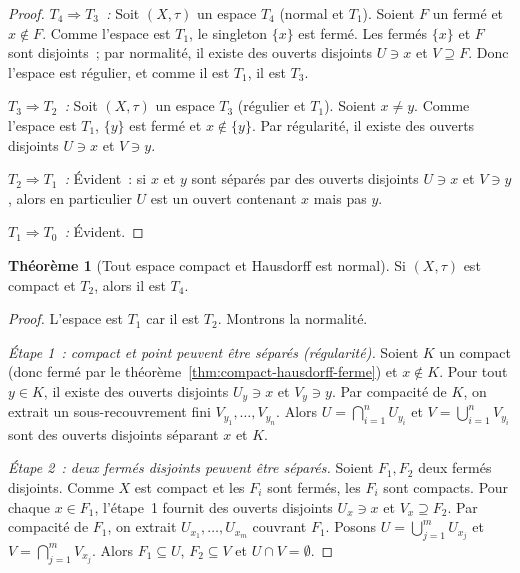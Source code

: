 \documentclass[12pt,a4paper,openany]{book}
\theoremstyle{definition}
\theoremstyle{cours}
\newtheorem{theoreme}{Théorème}[chapter]
\theoremstyle{coursnormal}
\begin{document}
\begin{proof}
  \emph{$T_4\Rightarrow T_3$~:} Soit $(X,\tau)$ un espace $T_4$ (normal et $T_1$).
  Soient $F$ un fermé et $x\notin F$. Comme l'espace est $T_1$, le singleton
  $\{x\}$ est fermé. Les fermés $\{x\}$ et $F$ sont disjoints~; par normalité,
  il existe des ouverts disjoints $U\ni x$ et $V\supseteq F$. Donc l'espace
  est régulier, et comme il est $T_1$, il est $T_3$.

  \medskip
  \emph{$T_3\Rightarrow T_2$~:} Soit $(X,\tau)$ un espace $T_3$ (régulier et $T_1$).
  Soient $x\neq y$. Comme l'espace est $T_1$, $\{y\}$ est fermé et $x\notin\{y\}$.
  Par régularité, il existe des ouverts disjoints $U\ni x$ et $V\ni y$.

  \medskip
  \emph{$T_2\Rightarrow T_1$~:} Évident~: si $x$ et $y$ sont séparés par
  des ouverts disjoints $U\ni x$ et $V\ni y$, alors en particulier $U$ est un
  ouvert contenant $x$ mais pas $y$.

  \medskip
  \emph{$T_1\Rightarrow T_0$~:} Évident.
\end{proof}

\begin{theoreme}[Tout espace compact et Hausdorff est normal]\label{thm:compact-hausdorff-normal}
  Si $(X,\tau)$ est compact et $T_2$,
  alors il est $T_4$.
\end{theoreme}

\begin{proof}
  L'espace est $T_1$ car il est $T_2$. Montrons la normalité.

  \medskip
  \emph{Étape 1~: compact et point peuvent être séparés (régularité).}
  Soient $K$ un compact (donc fermé par le théorème~\ref{thm:compact-hausdorff-ferme})
  et $x\notin K$. Pour tout $y\in K$, il existe des ouverts disjoints $U_y\ni x$
  et $V_y\ni y$. Par compacité de $K$, on extrait un sous-recouvrement fini
  $V_{y_1},\ldots,V_{y_n}$. Alors $U=\bigcap_{i=1}^n U_{y_i}$ et
  $V=\bigcup_{i=1}^n V_{y_i}$ sont des ouverts disjoints séparant $x$ et $K$.

  \medskip
  \emph{Étape 2~: deux fermés disjoints peuvent être séparés.}
  Soient $F_1,F_2$ deux fermés disjoints. Comme $X$ est compact et les $F_i$
  sont fermés, les $F_i$ sont compacts. Pour chaque $x\in F_1$, l'étape~1
  fournit des ouverts disjoints $U_x\ni x$ et $V_x\supseteq F_2$. Par
  compacité de $F_1$, on extrait $U_{x_1},\ldots,U_{x_m}$ couvrant $F_1$.
  Posons $U=\bigcup_{j=1}^m U_{x_j}$ et $V=\bigcap_{j=1}^m V_{x_j}$. Alors
  $F_1\subseteq U$, $F_2\subseteq V$ et $U\cap V=\emptyset$.
\end{proof}
\end{document}
